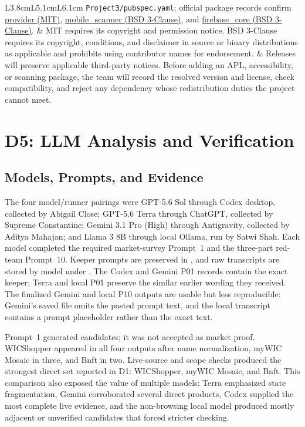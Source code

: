 \documentclass[sigconf]{acmart}
\begin{document}
\begin{table}[t]
\begin{tabular}{L{3.8cm}L{5.1cm}L{6.1cm}}
    \texttt{Project3/pubspec.yaml}; official package records confirm
    \href{https://pub.dev/packages/provider/license}{provider (MIT)},
    \href{https://pub.dev/packages/mobile_scanner/license}{mobile\_scanner (BSD 3-Clause)}, and
    \href{https://pub.dev/packages/firebase_core/license}{firebase\_core (BSD 3-Clause)}. &
    MIT requires its copyright and permission notice.  BSD 3-Clause requires
    its copyright, conditions, and disclaimer in source or binary distributions
    as applicable and prohibits using contributor names for endorsement. &
    Releases will preserve applicable third-party notices.  Before adding an
    APL, accessibility, or scanning package, the team will record the resolved
    version and license, check compatibility, and reject any dependency whose
    redistribution duties the project cannot meet. \\
    \bottomrule
  \end{tabular}
\end{table}

\section{D5: LLM Analysis and Verification}

\subsection{Models, Prompts, and Evidence}

The four model/runner pairings were GPT-5.6 Sol through Codex desktop,
collected by Abigail Close; GPT-5.6 Terra through ChatGPT, collected by Supreme
Constantine; Gemini 3.1 Pro (High) through Antigravity, collected by Aditya
Mahajan; and Llama 3 8B through local Ollama, run by Satwi Shah. Each model
completed the required market-survey Prompt~1 and the three-part red-team
Prompt~10. Keeper prompts are preserved in
, and raw transcripts are stored
by model under . The Codex and Gemini P01
records contain the exact keeper; Terra and local P01 preserve the similar
earlier wording they received. The finalized Gemini and local P10 outputs are
usable but less reproducible: Gemini's saved file omits the pasted prompt text,
and the local transcript contains a prompt placeholder rather than the exact
text.

Prompt~1 generated candidates; it was not accepted as market proof. WICShopper
appeared in all four outputs after name normalization, myWIC Mosaic in three,
and Bnft in two. Live-source and scope checks produced the strongest direct set
reported in D1: WICShopper, myWIC Mosaic, and Bnft. This comparison also exposed
the value of multiple models: Terra emphasized state fragmentation, Gemini
corroborated several direct products, Codex supplied the most complete live
evidence, and the non-browsing local model produced mostly adjacent or
unverified candidates that forced stricter checking.
\end{document}
